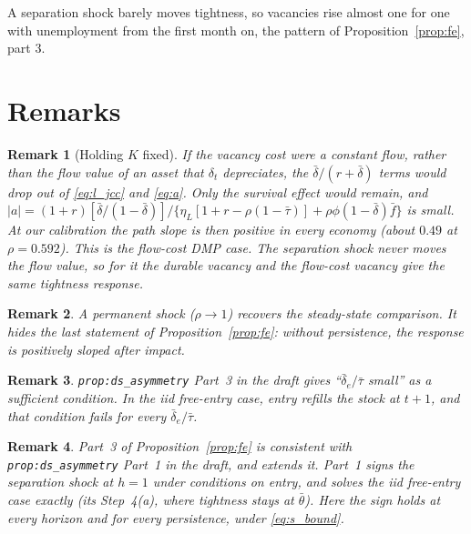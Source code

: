 \documentclass[authoryear, review, 12pt]{elsarticle}
\newtheorem{remark}{Remark}
\begin{document}
A separation shock barely moves tightness, so vacancies rise almost one for one with
unemployment from the first month on, the pattern of Proposition~\ref{prop:fe}, part 3.

\section{Remarks}

\begin{remark}[Holding $K$ fixed]\label{rem:flow}
If the vacancy cost were a constant flow, rather than the flow value of an asset that
$\delta_t$ depreciates, the $\bar\delta/(r+\bar\delta)$ terms would drop out of
\eqref{eq:l_jcc} and \eqref{eq:a}. Only the survival effect would remain, and
$\lvert a\rvert=(1+r)[\bar\delta/(1-\bar\delta)]/\{\eta_L[1+r-\rho(1-\bar\tau)]+\rho\phi(1-\bar\delta)\bar f\}$ is
small. At our calibration the path slope is then positive in every economy (about $0.49$
at $\rho=0.592$). This is the flow-cost DMP case. The separation shock never moves the
flow value, so for it the durable vacancy and the flow-cost vacancy give the same tightness
response.
\end{remark}

\begin{remark}
A permanent shock ($\rho\to1$) recovers the steady-state comparison. It hides the last
statement of Proposition~\ref{prop:fe}: without persistence, the response is positively
sloped after impact.
\end{remark}

\begin{remark}
\texttt{prop:ds\_asymmetry} Part~3 in the draft gives ``$\bar\delta_e/\bar\tau$ small'' as a
sufficient condition. In the iid free-entry case, entry refills the stock at $t+1$, and
that condition fails for every $\bar\delta_e/\bar\tau$.
\end{remark}

\begin{remark}
Part~3 of Proposition~\ref{prop:fe} is consistent with \texttt{prop:ds\_asymmetry} Part~1
in the draft, and extends it. Part~1 signs the separation shock at $h=1$ under conditions on
entry, and solves the iid free-entry case exactly (its Step~4(a), where tightness stays at
$\bar\theta$). Here the sign holds at every horizon and for every persistence, under
\eqref{eq:s_bound}.
\end{remark}
\end{document}
